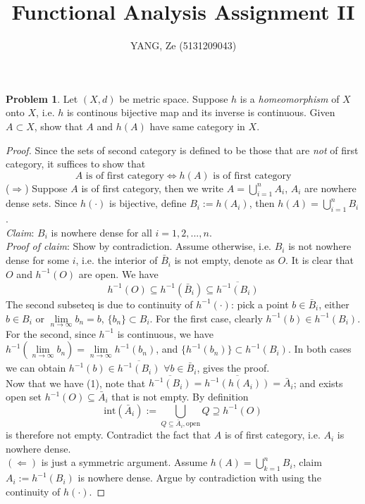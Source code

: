 \documentclass[a4paper, 10pt]{article}
\title{\textbf{Functional Analysis Assignment II}}
\author{YANG, Ze (5131209043)}
\theoremstyle{definition}
\newtheorem{problem}{Problem}
\theoremstyle{hSol}
\begin{document}
\maketitle
\begin{problem} Let $(X,d)$ be metric space. Suppose $h$ is a \textit{homeomorphism} of $X$ onto $X$, i.e. $h$ is continous bijective map and its inverse is continuous. Given $A \subset X$, show that $A$ and $h(A)$ have same category in $X$. 
\end{problem}
\begin{proof} Since the sets of second category is defined to be those that are \textit{not} of first category, it suffices to show that
$$\text{$A$ is of first category}\iff\text{$h(A)$ is of first category}$$
($\Rightarrow$) Suppose $A$ is of first category, then we write $A=\bigcup_{i=1}^{n}A_i$, $A_i$ are nowhere dense sets. Since $h(\cdot)$ is bijective, define $B_i:=h(A_i)$, then $h(A)=\bigcup_{i=1}^{n}B_i$. \\
\textit{Claim}: $B_i$ is nowhere dense for all $i=1,2,...,n$.\\
\textit{Proof of claim}: Show by contradiction. Assume otherwise, i.e. $B_i$ is not nowhere dense for some $i$, i.e. the interior of $\bar{B}_i$ is not empty, denote as $O$. It is clear that $O$ and $h^{-1}(O)$ are open. We have
\begin{equation}
  h^{-1}(O) \subseteq h^{-1}(\bar{B}_i) \subseteq \overline{h^{-1}(B_i)}
\end{equation}
The second subseteq is due to continuity of $h^{-1}(\cdot)$: pick a point $b\in \bar{B}_i$, either $b\in B_i$ or $\lim\limits_{n\rightarrow\infty}b_n=b$, $\{b_n\}\subset B_i$. For the first case, clearly $h^{-1}(b)\in h^{-1}(B_i)$. For the second, since $h^{-1}$ is continuous, we have $h^{-1}(\lim\limits_{n\rightarrow\infty}b_n)=\lim\limits_{n\rightarrow\infty}h^{-1}(b_n)$, and $\{h^{-1}(b_n)\}\subset h^{-1}(B_i)$. In both cases we can obtain $h^{-1}(b)\in \overline{h^{-1}(B_i)}$ $\forall b\in \bar{B}_i$, gives the proof.\\
Now that we have (1), note that $\overline{h^{-1}(B_i)}=\overline{h^{-1}(h(A_i))}=\bar{A}_i$; and exists open set $h^{-1}(O)\subseteq \bar{A}_i$ that is not empty. By definition
\begin{equation}
  \text{int}(\bar{A}_i):=\bigcup_{Q\subseteq \bar{A}_i, \text{open}} Q \supseteq h^{-1}(O)
\end{equation}
is therefore not empty. Contradict the fact that $A$ is of first category, i.e. $A_i$ is nowhere dense.\\
$(\Leftarrow)$ is just a symmetric argument. Assume $h(A)=\bigcup_{k=1}^{n}B_i$, claim $A_i:=h^{-1}(B_i)$ is nowhere dense. Argue by contradiction with using the continuity of $h(\cdot)$.
\end{proof} 
\end{document}
